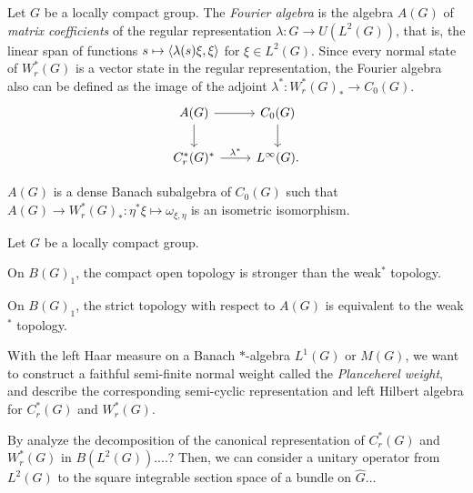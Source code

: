 \documentclass{../../large}
\begin{document}
\begin{prb}
Let $G$ be a locally compact group.
The \emph{Fourier algebra} is the algebra $A(G)$ of \emph{matrix coefficients} of the regular representation $\lambda:G\to U(L^2(G))$, that is, the linear span of functions $s\mapsto\langle\lambda(s)\xi,\xi\rangle$ for $\xi\in L^2(G)$.
Since every normal state of $W_r^*(G)$ is a vector state in the regular representation, the Fourier algebra also can be defined as the image of the adjoint $\lambda^*:W_r^*(G)_*\to C_0(G)$.
\[\begin{tikzcd}
A(G) \ar{r}\ar{d} & C_0(G) \ar{d}\\
C_r^*(G)^* \ar{r}{\lambda^*} & L^\infty(G).
\end{tikzcd}\]
\begin{parts}
\item $A(G)$ is a dense Banach subalgebra of $C_0(G)$ such that $A(G)\to W_r^*(G)_*:\eta^*\xi\mapsto\omega_{\xi,\eta}$ is an isometric isomorphism.
\end{parts}
\end{prb}
\begin{pf}

\end{pf}


\begin{prb}
Let $G$ be a locally compact group.
\begin{parts}
\item On $B(G)_1$, the compact open topology is stronger than the weak$^*$ topology.
\item On $B(G)_1$, the strict topology with respect to $A(G)$ is equivalent to the weak$^*$ topology.
\end{parts}
\end{prb}
\begin{pf}

\end{pf}


\begin{prb}
With the left Haar measure on a Banach $*$-algebra $L^1(G)$ or $M(G)$, we want to construct a faithful semi-finite normal weight called the \emph{Planceherel weight}, and describe the corresponding semi-cyclic representation and left Hilbert algebra for $C^*_r(G)$ and $W^*_r(G)$.

By analyze the decomposition of the canonical representation of $C_r^*(G)$ and $W_r^*(G)$ in $B(L^2(G))$....?
Then, we can consider a unitary operator from $L^2(G)$ to the square integrable section space of a bundle on $\hat G$...

\end{prb}
\begin{pf}

\end{pf}
\end{document}

